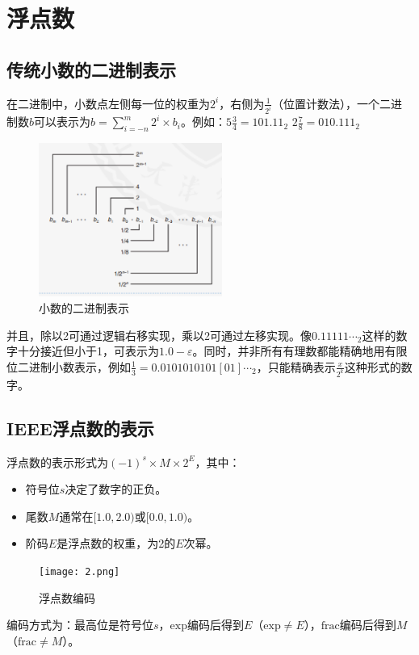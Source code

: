 \section{浮点数}
\subsection{传统小数的二进制表示}在二进制中，小数点左侧每一位的权重为\(2^{i}\)，右侧为\(\frac{1}{2^{i}}\)（位置计数法），一个二进制数\(b\)可以表示为\(b=\sum\limits_{i = -n}^{m}2^{i}\times b_{i}\)。例如：$5\frac{3}{4} = 101.11_{2}$
$2\frac{7}{8}= 010.111_{2}$
\begin{figure}[H]
    \centering
    \captionsetup{skip=4pt}
    \includegraphics[width=6cm]{figures/1.png}
    \caption{小数的二进制表示}
\end{figure}


并且，除以2可通过逻辑右移实现，乘以2可通过左移实现。像\(0.11111\cdots_{2}\)这样的数字十分接近但小于1，可表示为\(1.0-\varepsilon\)。同时，并非所有有理数都能精确地用有限位二进制小数表示，例如\(\frac{1}{3}=0.0101010101[01]\cdots_{2}\)，只能精确表示\(\frac{x}{2^{k}}\)这种形式的数字。

\subsection{IEEE浮点数的表示}
浮点数的表示形式为\((-1)^{s}\times M\times2^{E}\)，其中：
\begin{itemize}
    \item 符号位\(s\)决定了数字的正负。
    \item 尾数\(M\)通常在\([1.0,2.0)\)或\([0.0,1.0)\)。
    \item 阶码\(E\)是浮点数的权重，为2的\(E\)次幂。
\end{itemize}
\begin{figure}[H]
    \centering
    \captionsetup{skip=4pt}
    \texttt{[image: 2.png]}
    \caption{浮点数编码}
\end{figure}

编码方式为：最高位是符号位\(s\)，\(\text{exp}\)编码后得到\(E\)（\(\text{exp}\neq E\)），\(\text{frac}\)编码后得到\(M\)（\(\text{frac}\neq M\)）。

